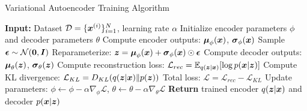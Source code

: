 

\begin{algorithm}[htbp]
\caption{Variational Autoencoder Training Algorithm}
\label{alg:vae-training}
\begin{algorithmic}[1]
\State \textbf{Input:} Dataset $\mathcal{D} = \{\boldsymbol{x}^{(i)}\}_{i=1}^{N}$, learning rate $\alpha$
\State Initialize encoder parameters $\phi$ and decoder parameters $\theta$
        \State Compute encoder outputs: $\boldsymbol{\mu}_{\phi}(\boldsymbol{x})$, $\boldsymbol{\sigma}_{\phi}(\boldsymbol{x})$
        \State Sample $\boldsymbol{\epsilon} \sim \mathcal{N}(\boldsymbol{0}, \boldsymbol{I})$
        \State Reparameterize: $\boldsymbol{z} = \boldsymbol{\mu}_{\phi}(\boldsymbol{x}) + \boldsymbol{\sigma}_{\phi}(\boldsymbol{x}) \odot \boldsymbol{\epsilon}$
        \State Compute decoder outputs: $\boldsymbol{\mu}_{\theta}(\boldsymbol{z})$, $\boldsymbol{\sigma}_{\theta}(\boldsymbol{z})$
        \State Compute reconstruction loss: $\mathcal{L}_{rec} = \mathbb{E}_{q(\boldsymbol{z}|\boldsymbol{x})}[\log p(\boldsymbol{x}|\boldsymbol{z})]$
        \State Compute KL divergence: $\mathcal{L}_{KL} = D_{KL}(q(\boldsymbol{z}|\boldsymbol{x}) \| p(\boldsymbol{z}))$
        \State Total loss: $\mathcal{L} = \mathcal{L}_{rec} - \mathcal{L}_{KL}$
        \State Update parameters: $\phi \leftarrow \phi - \alpha \nabla_{\phi} \mathcal{L}$, $\theta \leftarrow \theta - \alpha \nabla_{\theta} \mathcal{L}$
    \EndFor
\EndFor
\State \textbf{Return} trained encoder $q(\boldsymbol{z}|\boldsymbol{x})$ and decoder $p(\boldsymbol{x}|\boldsymbol{z})$
\end{algorithmic}
\end{algorithm}

